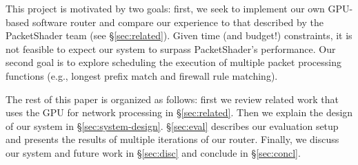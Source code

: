 This project is motivated by two goals: first, we seek to implement our own
GPU-based software router and compare our experience to that described by the
PacketShader team (see \S\ref{sec:related}). Given time (and budget!)
constraints, it is not feasible to expect our system to surpass PacketShader's
performance. Our second goal is to explore scheduling the execution of multiple
packet processing functions (e.g., longest prefix match and firewall rule
matching).

The rest of this paper is organized as follows: first we review related work
that uses the GPU for network processing in \S\ref{sec:related}. Then we
explain the design of our system in \S\ref{sec:system-design}. \S\ref{sec:eval}
describes our evaluation setup and presents the results of multiple iterations
of our router. Finally, we discuss our system and future work in
\S\ref{sec:disc} and conclude in \S\ref{sec:concl}.
